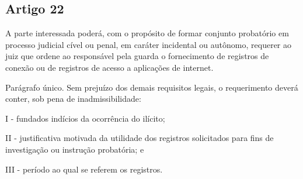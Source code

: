 \subsection{Artigo 22}
A parte interessada poderá, com o propósito de formar conjunto probatório em processo judicial cível ou penal, em caráter incidental ou autônomo, requerer ao juiz que ordene ao responsável pela guarda o fornecimento de registros de conexão ou de registros de acesso a aplicações de internet.

Parágrafo único.  Sem prejuízo dos demais requisitos legais, o requerimento deverá conter, sob pena de inadmissibilidade:

I - fundados indícios da ocorrência do ilícito;

II - justificativa motivada da utilidade dos registros solicitados para fins de investigação ou instrução probatória; e

III - período ao qual se referem os registros.
